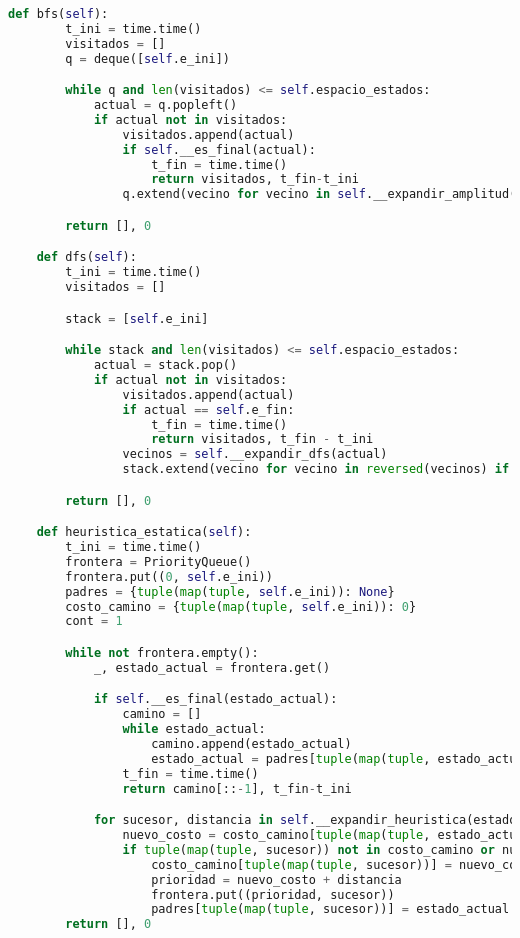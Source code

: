 \documentclass{article}
\begin{document}
\begin{lstlisting}[language=Python]
    def bfs(self):
        t_ini = time.time()
        visitados = []
        q = deque([self.e_ini])

        while q and len(visitados) <= self.espacio_estados:
            actual = q.popleft()
            if actual not in visitados:
                visitados.append(actual)
                if self.__es_final(actual):
                    t_fin = time.time()
                    return visitados, t_fin-t_ini
                q.extend(vecino for vecino in self.__expandir_amplitud(actual) if (vecino not in visitados))

        return [], 0

    def dfs(self):
        t_ini = time.time()
        visitados = []

        stack = [self.e_ini]

        while stack and len(visitados) <= self.espacio_estados:
            actual = stack.pop()
            if actual not in visitados:
                visitados.append(actual)
                if actual == self.e_fin:
                    t_fin = time.time()
                    return visitados, t_fin - t_ini
                vecinos = self.__expandir_dfs(actual)
                stack.extend(vecino for vecino in reversed(vecinos) if vecino not in visitados)

        return [], 0

    def heuristica_estatica(self):
        t_ini = time.time()
        frontera = PriorityQueue()
        frontera.put((0, self.e_ini))
        padres = {tuple(map(tuple, self.e_ini)): None}
        costo_camino = {tuple(map(tuple, self.e_ini)): 0}
        cont = 1

        while not frontera.empty():
            _, estado_actual = frontera.get()

            if self.__es_final(estado_actual):
                camino = []
                while estado_actual:
                    camino.append(estado_actual)
                    estado_actual = padres[tuple(map(tuple, estado_actual))]
                t_fin = time.time()
                return camino[::-1], t_fin-t_ini

            for sucesor, distancia in self.__expandir_heuristica(estado_actual):
                nuevo_costo = costo_camino[tuple(map(tuple, estado_actual))] + 1
                if tuple(map(tuple, sucesor)) not in costo_camino or nuevo_costo < costo_camino[tuple(map(tuple, sucesor))]:
                    costo_camino[tuple(map(tuple, sucesor))] = nuevo_costo
                    prioridad = nuevo_costo + distancia
                    frontera.put((prioridad, sucesor))
                    padres[tuple(map(tuple, sucesor))] = estado_actual
        return [], 0



\end{lstlisting}
\end{document}
